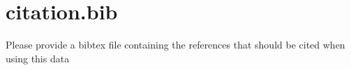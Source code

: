 \documentclass[]{elsarticle}
\begin{document}
\section{citation.bib}

Please provide a bibtex file containing the references that should be cited when using this data





\end{document}
